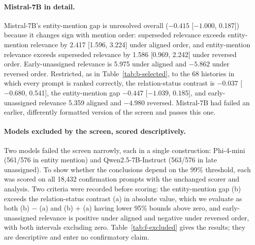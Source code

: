 \paragraph{Mistral-7B in detail.} Mistral-7B's entity-mention gap is unresolved overall ($-0.415$ [$-1.000$, 0.187]) because it changes sign with mention order: superseded relevance exceeds entity-mention relevance by 2.417 [1.596, 3.224] under aligned order, and entity-mention relevance exceeds superseded relevance by 1.586 [0.969, 2.242] under reversed order. Early-unassigned relevance is 5.975 under aligned and $-5.862$ under reversed order. Restricted, as in Table~\ref{tab:b-selected}, to the 68 histories in which every prompt is ranked correctly, the relation-status contrast is $-0.037$ [$-0.680$, 0.541], the entity-mention gap $-0.447$ [$-1.039$, 0.185], and early-unassigned relevance 5.359 aligned and $-4.980$ reversed. Mistral-7B had failed an earlier, differently formatted version of the screen and passes this one.

\paragraph{Models excluded by the screen, scored descriptively.} Two models failed the screen narrowly, each in a single construction: Phi-4-mini (561/576 in entity mention) and Qwen2.5-7B-Instruct (563/576 in late unassigned). To show whether the conclusions depend on the 99\% threshold, each was scored on all 18,432 confirmation prompts with the unchanged scorer and analysis. Two criteria were recorded before scoring: the entity-mention gap (b) exceeds the relation-status contrast (a) in absolute value, which we evaluate as both (b) $-$ (a) and (b) $+$ (a) having lower 95\% bounds above zero, and early-unassigned relevance is positive under aligned and negative under reversed order, with both intervals excluding zero. Table~\ref{tab:f-excluded} gives the results; they are descriptive and enter no confirmatory claim.

